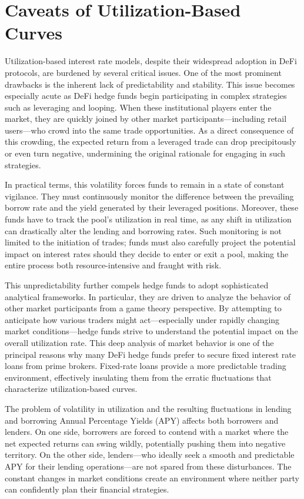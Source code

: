 \documentclass[12pt]{article}
\begin{document}
\section{Caveats of Utilization-Based Curves}

Utilization-based interest rate models, despite their widespread adoption in DeFi protocols, are burdened by several critical issues. One of the most prominent drawbacks is the inherent lack of predictability and stability. This issue becomes especially acute as DeFi hedge funds begin participating in complex strategies such as leveraging and looping. When these institutional players enter the market, they are quickly joined by other market participants—including retail users—who crowd into the same trade opportunities. As a direct consequence of this crowding, the expected return from a leveraged trade can drop precipitously or even turn negative, undermining the original rationale for engaging in such strategies.


In practical terms, this volatility forces funds to remain in a state of constant vigilance. They must continuously monitor the difference between the prevailing borrow rate and the yield generated by their leveraged positions. Moreover, these funds have to track the pool's utilization in real time, as any shift in utilization can drastically alter the lending and borrowing rates. Such monitoring is not limited to the initiation of trades; funds must also carefully project the potential impact on interest rates should they decide to enter or exit a pool, making the entire process both resource-intensive and fraught with risk.


This unpredictability further compels hedge funds to adopt sophisticated analytical frameworks. In particular, they are driven to analyze the behavior of other market participants from a game theory perspective. By attempting to anticipate how various traders might act—especially under rapidly changing market conditions—hedge funds strive to understand the potential impact on the overall utilization rate. This deep analysis of market behavior is one of the principal reasons why many DeFi hedge funds prefer to secure fixed interest rate loans from prime brokers. Fixed-rate loans provide a more predictable trading environment, effectively insulating them from the erratic fluctuations that characterize utilization-based curves.

The problem of volatility in utilization and the resulting fluctuations in lending and borrowing Annual Percentage Yields (APY) affects both borrowers and lenders. On one side, borrowers are forced to contend with a market where the net expected returns can swing wildly, potentially pushing them into negative territory. On the other side, lenders—who ideally seek a smooth and predictable APY for their lending operations—are not spared from these disturbances. The constant changes in market conditions create an environment where neither party can confidently plan their financial strategies.
\end{document}

